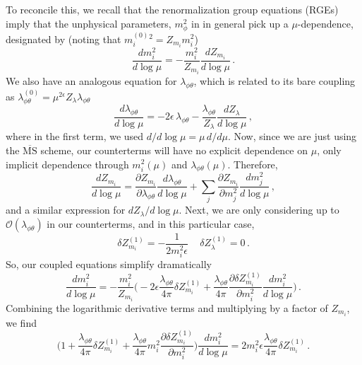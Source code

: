 \documentclass{article}
\numberwithin{equation}{subsection}
\begin{document}
To reconcile this, we recall that the renormalization group equations (RGEs) imply that the unphysical parameters, $m_\phi^2$ in in general pick up a $\mu$-dependence, designated by 
(noting that ${m_i^{(0)}}{}^2 = Z_{m_i}m_i^2$)
\begin{equation}
    \frac{dm_i^2}{d\log\mu} = -\frac{m_i^2}{Z_{m_i}}\frac{d Z_{m_i}}{d\log\mu}\,.
\end{equation}
We also have an analogous equation for $\lambda_{\phi\theta}$, which is related to its bare coupling as $\lambda_{\phi\theta}^{(0)} = \mu^{2\epsilon}Z_\lambda\lambda_{\phi\theta}$
\begin{equation}
    \frac{d\lambda_{\phi\theta}}{d\log\mu} = -2\epsilon\,\lambda_{\phi\theta} - \frac{\lambda_{\phi\theta}}{Z_\lambda}\frac{dZ_{\lambda}}{d\log\mu}\,,
\end{equation}
where in the first term, we used $d/d\log\mu = \mu\,d/d\mu$. Now, since we are just using the $\overline{\text{MS}}$ scheme, our counterterms will have no explicit
dependence on $\mu$, only implicit dependence through $m_i^2(\mu)$ and $\lambda_{\phi\theta}(\mu)$. Therefore,
\begin{equation}
	\frac{dZ_{m_i}}{d\log\mu} = \frac{\partial Z_{m_i}}{\partial \lambda_{\phi\theta}}\frac{d\lambda_{\phi\theta}}{d\log\mu}
		+ \sum_j\frac{\partial Z_{m_i}}{\partial m_j^2}\frac{d m_j^2}{d\log\mu}\,,
\end{equation}
and a similar expression for $dZ_\lambda/d\log\mu$. Next, we are only considering up to $\mathcal{O}(\lambda_{\phi\theta})$ in our counterterms, and in this particular case,
\begin{equation}
	\delta Z_{m_i}^{(1)} = -\frac{1}{2m_i^2\epsilon}\, \quad \delta Z_\lambda^{(1)} = 0\,.
\end{equation}
So, our coupled equations simplify dramatically
\begin{equation}
	\frac{dm_i^2}{d\log\mu} = -\frac{m_i^2}{Z_{m_i}}\Bigg(- 2\epsilon\frac{\lambda_{\phi\theta}}{4\pi}\delta Z_{m_i}^{(1)}
	+ \frac{\lambda_{\phi\theta}}{4\pi}\frac{\partial \delta Z_{m_i}^{(1)}}{\partial m_i^2}\frac{dm_i^2}{d\log\mu}\Bigg)\,.
\end{equation}
Combining the logarithmic derivative terms and multiplying by a factor of $Z_{m_i}$, we find
\begin{equation}\label{eq:preRGE}
	\Bigg(1 + \frac{\lambda_{\phi\theta}}{4\pi}\delta Z_{m_i}^{(1)} + \frac{\lambda_{\phi\theta}}{4\pi}m_i^2\frac{\partial \delta Z_{m_i}^{(1)}}{\partial m_i^2}\Bigg)
	\frac{dm_i^2}{d\log\mu} = 2 m_i^2\epsilon\frac{\lambda_{\phi\theta}}{4\pi}\delta Z_{m_i}^{(1)}\,.
\end{equation}
\end{document}
